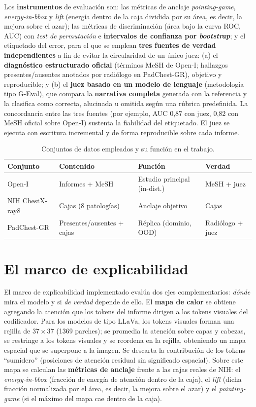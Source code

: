 Los \textbf{instrumentos} de evaluación son: las métricas de anclaje \textit{pointing-game},
\textit{energy-in-bbox} y \textit{lift} (energía dentro de la caja dividida por su área, es decir,
la mejora sobre el azar); las métricas de discriminación (área bajo la curva ROC, AUC) con
\textit{test de permutación} e \textbf{intervalos de confianza por \emph{bootstrap}}; y el
etiquetado del error, para el que se emplean \textbf{tres fuentes de verdad independientes} a fin de
evitar la circularidad de un único juez: (a) el \textbf{diagnóstico estructurado oficial} (términos
MeSH de Open-I; hallazgos presentes/ausentes anotados por radiólogo en PadChest-GR), objetivo y
reproducible; y (b) el \textbf{juez basado en un modelo de lenguaje} (metodología tipo G-Eval), que
compara la \textbf{narrativa completa} generada con la referencia y la clasifica como correcta,
alucinada u omitida según una rúbrica predefinida. La concordancia entre las tres fuentes (por
ejemplo, AUC 0,87 con juez, 0,82 con MeSH oficial sobre Open-I) sustenta la fiabilidad del
etiquetado. El juez se ejecuta con escritura incremental y de forma reproducible sobre cada informe.

\begin{table}[t]\centering
\caption{Conjuntos de datos empleados y su función en el trabajo.}
\label{tab:datos}
\begin{tabular}{llll}
\toprule
Conjunto & Contenido & Función & Verdad \\ \midrule
Open-I & Informes + MeSH & Estudio principal (in-dist.) & MeSH + juez \\
NIH ChestX-ray8 & Cajas (8 patologías) & Anclaje objetivo & Cajas \\
PadChest-GR & Presentes/ausentes + cajas & Réplica (dominio, OOD) & Radiólogo + juez \\ \bottomrule
\end{tabular}
\end{table}

\section{El marco de explicabilidad}
El marco de explicabilidad implementado evalúa dos ejes complementarios: \emph{dónde} mira el modelo y
si \emph{de verdad} depende de ello. El \textbf{mapa de calor} se obtiene agregando la atención que
los tokens del informe dirigen a los tokens visuales del codificador. Para los modelos de tipo LLaVa,
los tokens visuales forman una rejilla de $37\times37$ (1369 parches); se promedia la atención sobre
capas y cabezas, se restringe a los tokens visuales y se reordena en la rejilla, obteniendo un mapa
espacial que se superpone a la imagen. Se descarta la contribución de los tokens ``sumidero''
(posiciones de atención residual sin significado espacial). Sobre este mapa se calculan las
\textbf{métricas de anclaje} frente a las cajas reales de NIH: el \textit{energy-in-bbox} (fracción de
energía de atención dentro de la caja), el \textit{lift} (dicha fracción normalizada por el área,
es decir, la mejora sobre el azar) y el \textit{pointing-game} (si el máximo del mapa cae dentro de la
caja).


